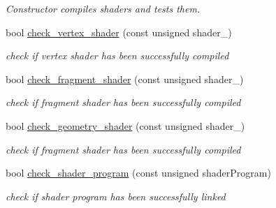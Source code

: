 \begin{DoxyCompactItemize}
\begin{DoxyCompactList}\small\item\em Constructor compiles shaders and tests them. \end{DoxyCompactList}\item 
bool \mbox{\hyperlink{classShader_3_01RENDER__TYPE_1_1CUSTOM_01_4_afca4ecec5bed3cf6a9f219ce52e5343e}{check\+\_\+vertex\+\_\+shader}} (const unsigned shader\+\_\+)
\begin{DoxyCompactList}\small\item\em check if vertex shader has been successfully compiled \end{DoxyCompactList}\item 
bool \mbox{\hyperlink{classShader_3_01RENDER__TYPE_1_1CUSTOM_01_4_a8ba4a9ccbbf73e471434981a62b15d41}{check\+\_\+fragment\+\_\+shader}} (const unsigned shader\+\_\+)
\begin{DoxyCompactList}\small\item\em check if fragment shader has been successfully compiled \end{DoxyCompactList}\item 
bool \mbox{\hyperlink{classShader_3_01RENDER__TYPE_1_1CUSTOM_01_4_aca3ba4448a05303b92667e88e18f5cfb}{check\+\_\+geometry\+\_\+shader}} (const unsigned shader\+\_\+)
\begin{DoxyCompactList}\small\item\em check if fragment shader has been successfully compiled \end{DoxyCompactList}\item 
bool \mbox{\hyperlink{classShader_3_01RENDER__TYPE_1_1CUSTOM_01_4_af59ced307a40764c2fa1acef66e074b3}{check\+\_\+shader\+\_\+program}} (const unsigned shader\+Program)
\begin{DoxyCompactList}\small\item\em check if shader program has been successfully linked \end{DoxyCompactList}\end{DoxyCompactItemize}
